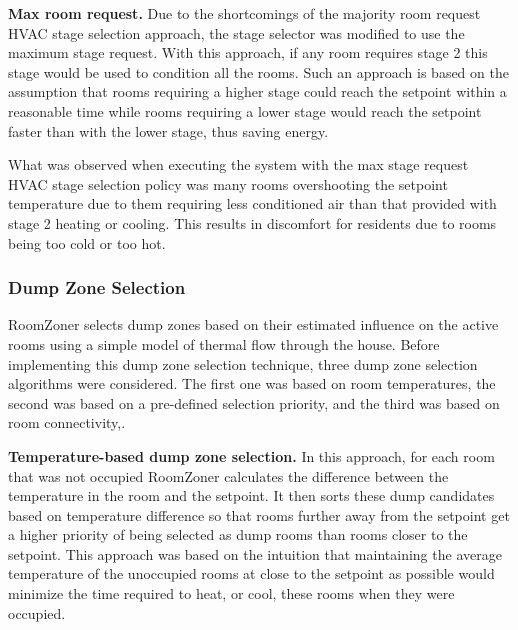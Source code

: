 \par {\bf Max room request. }
Due to the shortcomings of the majority room request HVAC stage selection
approach, the stage selector was modified to use the maximum stage request. With
this approach, if any room requires stage 2 this stage would be used to
condition all the rooms. Such an approach is based on the assumption that rooms
requiring a higher stage could reach the setpoint within a reasonable time while
rooms requiring a lower stage would reach the setpoint faster than with the
lower stage, thus saving energy.

What was observed when executing the system with the max stage request HVAC
stage selection policy was many rooms overshooting the setpoint temperature due
to them requiring less conditioned air than that provided with stage 2 heating
or cooling. This results in discomfort for residents due to rooms being too cold
or too hot.

\subsubsection{Dump Zone Selection}
RoomZoner selects dump zones based on their estimated influence on the active
rooms using a simple model of thermal flow through the house. Before
implementing this dump zone selection technique, three dump zone selection
algorithms were considered. The first one was based on room temperatures, the
second was based on a pre-defined selection priority, and the third was based on
room connectivity,.
  
\par {\bf Temperature-based dump zone selection. } In this approach, for each
room that was not occupied RoomZoner calculates the difference between
the temperature in the room and the setpoint. It then sorts these dump
candidates based on temperature difference so that rooms further away from the
setpoint get a higher priority of being selected as dump rooms than rooms closer
to the setpoint. This approach was based on the intuition that maintaining the
average temperature of the unoccupied rooms at close to the setpoint as possible
would minimize the time required to heat, or cool, these rooms when they were
occupied.

